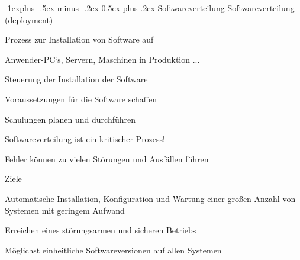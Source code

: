 \documentclass[a4paper]{article}
\makeatletter
\renewcommand{\subsection}{\@startsection{subsection}{2}{0mm}%
                                {-1explus -.5ex minus -.2ex}%
                                {0.5ex plus .2ex}%
                                {\normalfont\normalsize\bfseries}}
\makeatother
\begin{document}
\begin{multicols}{3}
  \subsection{Softwareverteilung}
  Softwareverteilung (deployment)
  \begin{itemize*}
    \item Prozess zur Installation von Software auf
          \begin{itemize*}
            \item Anwender-PC‘s, Servern, Maschinen in Produktion ...
          \end{itemize*}
    \item Steuerung der Installation der Software
    \item Voraussetzungen für die Software schaffen
          \begin{itemize*}
            \item Schulungen planen und durchführen
          \end{itemize*}
    \item Softwareverteilung ist ein kritischer Prozess!
          \begin{itemize*}
            \item Fehler können zu vielen Störungen und Ausfällen führen
          \end{itemize*}
    \item Ziele
          \begin{itemize*}
            \item Automatische Installation, Konfiguration und Wartung einer großen Anzahl von Systemen mit geringem Aufwand
            \item Erreichen eines störungsarmen und sicheren Betriebs
            \item Möglichst einheitliche Softwareversionen auf allen Systemen
          \end{itemize*}
  \end{itemize*}


\end{multicols}
\end{document}
